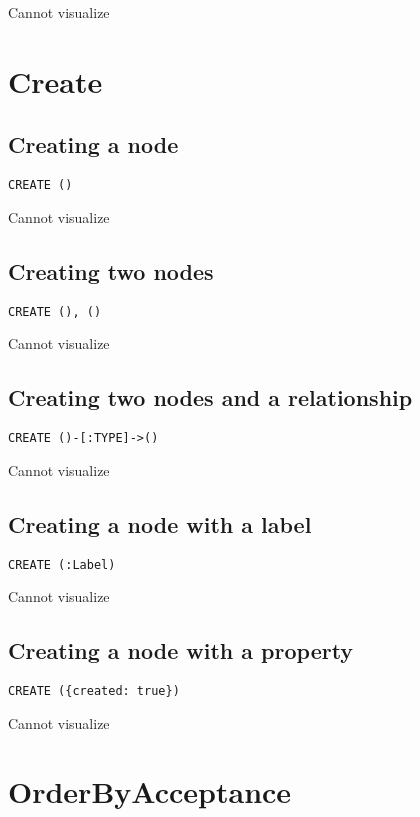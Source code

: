 Cannot visualize
\section{Create}

\subsection{Creating a node}

\begin{lstlisting}
CREATE ()
\end{lstlisting}

Cannot visualize
\subsection{Creating two nodes}

\begin{lstlisting}
CREATE (), ()
\end{lstlisting}

Cannot visualize
\subsection{Creating two nodes and a relationship}

\begin{lstlisting}
CREATE ()-[:TYPE]->()
\end{lstlisting}

Cannot visualize
\subsection{Creating a node with a label}

\begin{lstlisting}
CREATE (:Label)
\end{lstlisting}

Cannot visualize
\subsection{Creating a node with a property}

\begin{lstlisting}
CREATE ({created: true})
\end{lstlisting}

Cannot visualize
\section{OrderByAcceptance}

